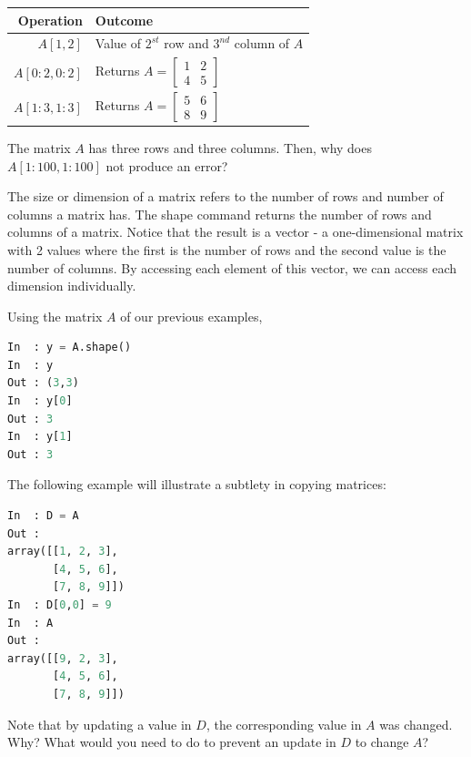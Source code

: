 \begin{tabular}{r|l}
Operation 			& Outcome \\
\hline
$A[1,2]$ 				&  Value of $2^{st}$ row and $3^{nd}$ column of $A$\\
$A[0:2,0:2]$ 		&  Returns $A = \begin{bmatrix} 1 & 2 \\ 4 & 5\end{bmatrix} $\\
$A[1:3,1:3]$ 		&  Returns $A = \begin{bmatrix} 5 & 6 \\ 8 & 9\end{bmatrix} $\\
\hline
\end{tabular}

\vs

The matrix $A$ has three rows and three columns. Then, why does $A[1:100,1:100]$  not produce an error? \QA

The size or dimension of a matrix refers to the number of rows and
number of columns a matrix has. The {\s shape} command returns the number
of rows and columns of a matrix. 
Notice that the result is a vector - a one-dimensional matrix with
2 values where the first is the number of rows and the second value
is the number of columns. By accessing each element of this vector,
we can access each dimension individually. 

Using the matrix $A$ of our previous examples, 

\begin{lstlisting}[language=Python]
In 	: y = A.shape()
In 	: y
Out : (3,3)
In 	: y[0]
Out : 3
In 	: y[1]
Out : 3
\end{lstlisting}

The following example will illustrate a subtlety in copying matrices:

\begin{lstlisting}[language=Python]
In 	: D = A
Out : 
array([[1, 2, 3],
       [4, 5, 6],
       [7, 8, 9]])
In 	: D[0,0] = 9
In 	: A
Out : 
array([[9, 2, 3],
       [4, 5, 6],
       [7, 8, 9]])
\end{lstlisting}

Note that by updating a value in $D$, the corresponding value in $A$ was changed. Why? What would you need to do to prevent an update in $D$ to change $A$?  \QA 

